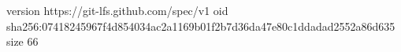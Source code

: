version https://git-lfs.github.com/spec/v1
oid sha256:07418245967f4d854034ac2a1169b01f2b7d36da47e80c1ddadad2552a86d635
size 66
